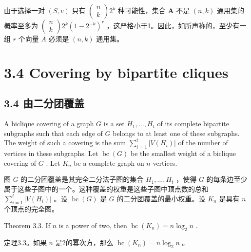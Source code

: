 \documentclass[10pt]{article}
\begin{document}
\begin{tcolorbox}\relax
由于选择一对 \(\left( {S,v}\right)\) 只有 \(\left( \begin{array}{l} n \\  k \end{array}\right) {2}^{k}\) 种可能性，集合 \(\mathbf{A}\) 不是 \(\left( {n,k}\right)\) 通用集的概率至多为 \(\left( \begin{array}{l} n \\  k \end{array}\right) {2}^{k}{\left( 1 - {2}^{-k}\right) }^{r}\) ，这严格小于1。因此，如所声称的，至少有一组 \(r\) 个向量 \(A\) 必须是 \(\left( {n,k}\right)\) 通用集。
\end{tcolorbox}

\section*{3.4 Covering by bipartite cliques}

\begin{tcolorbox}\relax
\section*{3.4 由二分团覆盖}
\end{tcolorbox}

A biclique covering of a graph \(G\) is a set \({H}_{1},\ldots ,{H}_{t}\) of its complete bipartite subgraphs such that each edge of \(G\) belongs to at least one of these subgraphs. The weight of such a covering is the sum \(\mathop{\sum }\limits_{{i = 1}}^{t}\left| {V\left( {H}_{i}\right) }\right|\) of the number of vertices in these subgraphs. Let \(\operatorname{bc}\left( G\right)\) be the smallest weight of a biclique covering of \(G\) . Let \({K}_{n}\) be a complete graph on \(n\) vertices.

\begin{tcolorbox}\relax
图 \(G\) 的二分团覆盖是其完全二分法子图的集合 \({H}_{1},\ldots ,{H}_{t}\) ，使得 \(G\) 的每条边至少属于这些子图中的一个。这种覆盖的权重是这些子图中顶点数的总和 \(\mathop{\sum }\limits_{{i = 1}}^{t}\left| {V\left( {H}_{i}\right) }\right|\) 。设 \(\operatorname{bc}\left( G\right)\) 是 \(G\) 的二分团覆盖的最小权重。设 \({K}_{n}\) 是具有 \(n\) 个顶点的完全图。
\end{tcolorbox}

Theorem 3.3. If \(n\) is a power of two, then \(\operatorname{bc}\left( {K}_{n}\right)  = n{\log }_{2}n\) .

\begin{tcolorbox}\relax
定理3.3。如果 \(n\) 是2的幂次方，那么 \(\operatorname{bc}\left( {K}_{n}\right)  = n{\log }_{2}n\) 。
\end{tcolorbox}
\end{document}
